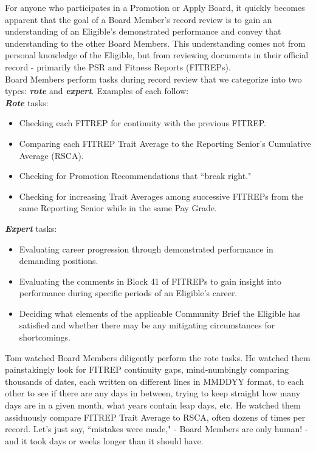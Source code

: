 \documentclass[UTF8]{article}
\begin{document}
For anyone who participates in a Promotion or Apply Board, it quickly becomes apparent
that the goal of a Board Member's record review is to gain an understanding of
an Eligible's demonstrated performance and convey that understanding to the
other Board Members. This understanding comes not from personal knowledge of the
Eligible, but from reviewing documents in their official record - primarily the
PSR and Fitness Reports (FITREPs).\\


Board Members perform tasks during record review that we categorize into two
types:
\textit{\textbf{rote}} and \textit{\textbf{expert}}. Examples of each follow:\\

\textit{\textbf{Rote}} tasks: 
\begin{itemize}
  \item Checking each FITREP for continuity with the previous FITREP.
  \item Comparing each FITREP Trait Average to the Reporting Senior's Cumulative
  Average (RSCA).
  \item Checking for Promotion Recommendations that ``break right."
  \item Checking for increasing Trait Averages among successive FITREPs from the
  same Reporting Senior while in the same Pay Grade. 
\end{itemize}

\textit{\textbf{Expert}} tasks: 
\begin{itemize}
  \item Evaluating career progression through demonstrated performance in
  demanding positions.
  \item Evaluating the comments in Block 41 of FITREPs to gain insight into 
  performance during specific periods of an Eligible's career.
  \item Deciding what elements of the applicable Community Brief the Eligible
  has satisfied and whether there may be any mitigating circumstances for
  shortcomings.
\end{itemize}

Tom watched Board Members diligently perform the rote tasks. He watched them 
painstakingly look for FITREP continuity gaps, mind-numbingly comparing thousands 
of dates, each written on different lines in MMDDYY format, to each other to see 
if there are any days in between, trying to keep straight how many days are in a
given month, what years contain leap days, etc. He watched them assiduously compare 
FITREP Trait Average to RSCA, often dozens of times per record. Let's just say, 
``mistakes were made," - Board Members are only human! - and it took days or weeks
longer than it should have. \\
\end{document}
